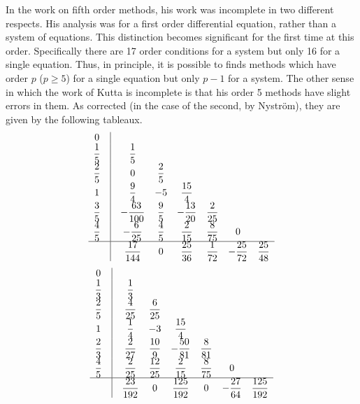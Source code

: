 \documentclass[a4paper,oneside]{book}
\numberwithin{equation}{chapter}
\begin{document}
In the work on fifth order methods, his work was incomplete in two different respects. His analysis was for a first order differential equation, rather than a system of equations. This distinction becomes significant for the first time at this order. Specifically there are 17 order conditions for a system but only 16 for a single equation. Thus, in principle, it is possible to finds methods which have order $p$ ($p \ge 5$) for a single equation but only $p-1$ for a system. The other sense in which the work of Kutta is incomplete is that his order 5 methods have slight errors in them. As corrected (in the case of the second, by Nystr\"{o}m), they are given by the following tableaux.
\begin{align}
\begin{array}{*{20}{c}}
0&\vline& {}&{}&{}&{}&{}&{}\\
{\dfrac{1}{5}}&\vline& {\dfrac{1}{5}}&{}&{}&{}&{}&{}\\
{\dfrac{2}{5}}&\vline& 0&{\dfrac{2}{5}}&{}&{}&{}&{}\\
1&\vline& {\dfrac{9}{4}}&{ - 5}&{\dfrac{{15}}{4}}&{}&{}&{}\\
{\dfrac{3}{5}}&\vline& { - \dfrac{{63}}{{100}}}&{\dfrac{9}{5}}&{ - \dfrac{{13}}{{20}}}&{\dfrac{2}{{25}}}&{}&{}\\
{\dfrac{4}{5}}&\vline& { - \dfrac{6}{{25}}}&{\dfrac{4}{5}}&{\dfrac{2}{{15}}}&{\dfrac{8}{{75}}}&0&{}\\
\hline
{}&\vline& {\dfrac{{17}}{{144}}}&0&{\dfrac{{25}}{{36}}}&{\dfrac{1}{{72}}}&{ - \dfrac{{25}}{{72}}}&{\dfrac{{25}}{{48}}}
\end{array}
\end{align}
\begin{align}
\begin{array}{*{20}{c}}
0&\vline& {}&{}&{}&{}&{}&{}\\
{\dfrac{1}{3}}&\vline& {\dfrac{1}{3}}&{}&{}&{}&{}&{}\\
{\dfrac{2}{5}}&\vline& {\dfrac{4}{{25}}}&{\dfrac{6}{{25}}}&{}&{}&{}&{}\\
1&\vline& {\dfrac{1}{4}}&{ - 3}&{\dfrac{{15}}{4}}&{}&{}&{}\\
{\dfrac{2}{3}}&\vline& {\dfrac{2}{{27}}}&{\dfrac{{10}}{9}}&{ - \dfrac{{50}}{{81}}}&{\dfrac{8}{{81}}}&{}&{}\\
{\dfrac{4}{5}}&\vline& {\dfrac{2}{{25}}}&{\dfrac{{12}}{{25}}}&{\dfrac{2}{{15}}}&{\dfrac{8}{{75}}}&0&{}\\
\hline
{}&\vline& {\dfrac{{23}}{{192}}}&0&{\dfrac{{125}}{{192}}}&0&{ - \dfrac{{27}}{{64}}}&{\dfrac{{125}}{{192}}}
\end{array}
\end{align}
\end{document}

